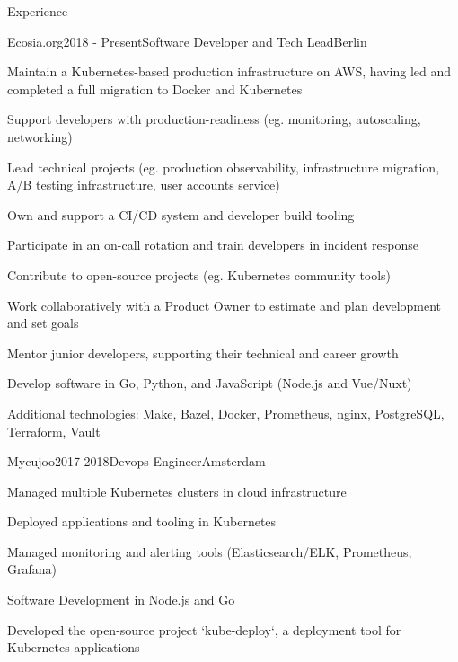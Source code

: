 \documentclass{resume} %
\begin{document}
\vspace{5 mm}

\begin{rSection}{Experience}

\begin{rSubsection}{{Ecosia.org}}{2018 - Present}{Software Developer and Tech Lead}{Berlin}
    \item Maintain a Kubernetes-based production infrastructure on AWS, having led and completed a full migration to Docker and Kubernetes
    \item Support developers with production-readiness (eg. monitoring, autoscaling, networking)
    \item Lead technical projects (eg. production observability, infrastructure migration, A/B testing infrastructure, user accounts service)
    \item Own and support a CI/CD system and developer build tooling
    \item Participate in an on-call rotation and train developers in incident response
    \item Contribute to open-source projects (eg. Kubernetes community tools)
    \item Work collaboratively with a Product Owner to estimate and plan development and set goals
    \item Mentor junior developers, supporting their technical and career growth
    \item Develop software in Go, Python, and JavaScript (Node.js and Vue/Nuxt)
    \item Additional technologies: Make, Bazel, Docker, Prometheus, nginx, PostgreSQL, Terraform, Vault
\end{rSubsection}


\begin{rSubsection}{{Mycujoo}}{2017-2018}{Devops Engineer}{Amsterdam}
    \item Managed multiple Kubernetes clusters in cloud infrastructure
    \item Deployed applications and tooling in Kubernetes
    \item Managed monitoring and alerting tools (Elasticsearch/ELK, Prometheus, Grafana)
    \item Software Development in Node.js and Go
    \item Developed the open-source project `kube-deploy`, a deployment tool for Kubernetes applications
\end{rSubsection}


\end{rSection}
\end{document}
